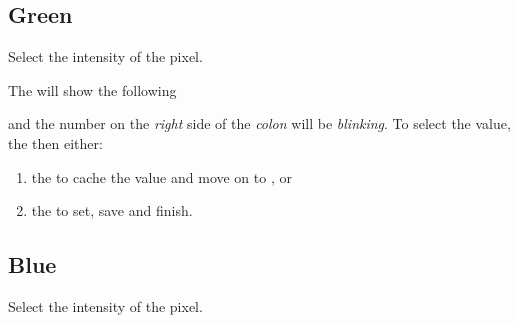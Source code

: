 \subsection{Green} 

Select the intensity of the  pixel.

\par\medskip

The  will show the following

\begin{figure}[H]
\centering
\end{figure}

and the number on the \textit{right} side of the \textit{colon} will be
\textit{blinking}.  To select the  value,  the  then
either:

\begin{enumerate}
  \item {} the  to cache the value and move on to , or
  \item {} the  to set, save and finish.
\end{enumerate}


\subsection{Blue} 

Select the intensity of the  pixel.

\par\medskip


